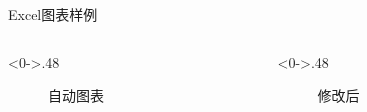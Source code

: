 \documentclass[utf8,dvipsnames,aspectratio=169]{beamer}
\begin{document}
\begin{frame}{Excel图表样例}
	\begin{columns}
	\begin{column}<0->{.48\textwidth}
		\begin{figure}[thpb]
			\centering
			\caption{自动图表}
			\label{fig:excel-2}
		\end{figure}
	\end{column}
	\begin{column}<0->{.48\textwidth}
		\begin{figure}[thpb]
			\centering
			\caption{修改后}
			\label{fig:excel-1}
		\end{figure}
	\end{column}
	\end{columns}
\end{frame}
\end{document}
